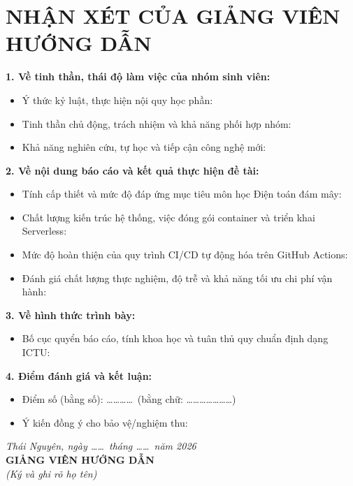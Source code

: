 
\chapter*{NHẬN XÉT CỦA GIẢNG VIÊN HƯỚNG DẪN}

\noindent\textbf{1. Về tinh thần, thái độ làm việc của nhóm sinh viên:}
\begin{itemize}
    \item Ý thức kỷ luật, thực hiện nội quy học phần: \dotfill
    \item Tinh thần chủ động, trách nhiệm và khả năng phối hợp nhóm: \dotfill
    \item Khả năng nghiên cứu, tự học và tiếp cận công nghệ mới: \dotfill
\end{itemize}

\noindent\textbf{2. Về nội dung báo cáo và kết quả thực hiện đề tài:}
\begin{itemize}
    \item Tính cấp thiết và mức độ đáp ứng mục tiêu môn học Điện toán đám mây: \dotfill
    \item Chất lượng kiến trúc hệ thống, việc đóng gói container và triển khai Serverless: \dotfill
    \item Mức độ hoàn thiện của quy trình CI/CD tự động hóa trên GitHub Actions: \dotfill
    \item Đánh giá chất lượng thực nghiệm, độ trễ và khả năng tối ưu chi phí vận hành: \dotfill
\end{itemize}

\noindent\textbf{3. Về hình thức trình bày:}
\begin{itemize}
    \item Bố cục quyển báo cáo, tính khoa học và tuân thủ quy chuẩn định dạng ICTU: \dotfill
\end{itemize}

\noindent\textbf{4. Điểm đánh giá và kết luận:}
\begin{itemize}
    \item Điểm số (bằng số): \dots\dots\dots\dots\ (bằng chữ: \dots\dots\dots\dots\dots\dots\dots)
    \item Ý kiến đồng ý cho bảo vệ/nghiệm thu: \dotfill
\end{itemize}

\vspace{0.3cm}
\begin{flushright}
    \textit{Thái Nguyên, ngày \dots\dots\ tháng \dots\dots\ năm 2026}\\[0.3cm]
    \textbf{GIẢNG VIÊN HƯỚNG DẪN}\\[0.2cm]
    \textit{(Ký và ghi rõ họ tên)}\\[2.5cm]
\end{flushright}
